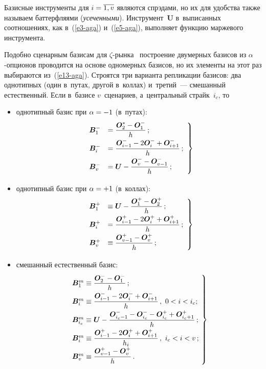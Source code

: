 \begin{multicols}{2}
  Базисные инструменты для $i\hm=\overline{1,v}$ являются спрэдами, но их для 
удобства также называем баттерфляями (\textit{усеченными}). 
Инструмент~$\bm{U}$ в~выписанных соотношениях, как в~(\ref{e3-aga}) 
и~(\ref{e5-aga}),  выполняет функцию маржевого инструмента. 
  
  Подобно сценарным базисам для $\zeta$-рынка~\cite{6-aga} построение 
двумерных базисов из $\alpha$-оп\-ци\-онов проводится на основе одномерных 
базисов, но их элементы на этот раз выбираются из~(\ref{e13-aga}). Строятся 
три варианта репликации базисов: два однотипных (один в~путах, другой 
в~коллах) и~третий~--- смешанный естественный. Если в~базисе $v$~сценариев, 
а~центральный страйк~$i_c$, то 
  \begin{itemize}
\item однотипный базис при $\alpha\hm=-1$ (в~путах):
\begin{equation}
\left.
\begin{array}{rl}
\bm{B}_1^- &=\displaystyle\frac{\displaystyle \bm{O}_2^*-\bm{O}_1^-\mathstrut}{\displaystyle h\mathstrut}\,;\\[6pt]
  \bm{B}_i^- &= \displaystyle\frac{\displaystyle \bm{O}^-_{i-1} -2\bm{O}_i^- +\bm{O}^-_{i+1}\mathstrut}{\displaystyle h\mathstrut}\,;\\[6pt]
   \bm{B}^-_v &=\bm{U}- \displaystyle\frac{\displaystyle \bm{O}_v^- -\bm{O}^-_{v-1}\mathstrut}{\displaystyle h\mathstrut}\,;
   \end{array}
   \right\}
\label{e14-aga}
\end{equation}
\item однотипный базис при $\alpha\hm=+1$ (в~коллах):
\begin{equation}
\left.
\begin{array}{rl}
\bm{B}_1^+ &\equiv \bm{U} - \displaystyle\frac{\displaystyle \bm{O}_1^+ -\bm{O}_2^+\mathstrut}{\displaystyle h\mathstrut}\,;\\[6pt]
  \bm{B}_i^+ &= \displaystyle\frac{\displaystyle \bm{O}^+_{i-1} -2\bm{O}_i^+ +\bm{O}^+_{i+1}\mathstrut}{\displaystyle h\mathstrut}\,;\\[6pt]
    \bm{B}_v^+ &\equiv \displaystyle\frac{\displaystyle \bm{O}^+_{v-1} -\bm{O}_v^+\mathstrut}{\displaystyle h\mathstrut}\,;
    \end{array}
    \right\}
\label{e15-aga}
\end{equation}
\item смешанный естественный базис:
\begin{equation}
\left.
\begin{array}{l}
\!\!\!\bm{B}_1^m\equiv \fr{\bm{O}_2^- -  \bm{O}_1^-}{h}\,;\\[6pt]
  \!\!\!\bm{B}_i^m \equiv \fr{\bm{O}^-_{i-1} -2\bm{O}_i^- +\bm{O}^-_{i+1}}{h}\,,\ 0< i< i_c;\\[6pt]
\!\!\!\bm{B}^m_{i_c} \equiv  \bm{U}-\fr{\bm{O}^-_{i_c-1} -\bm{O}^-_{i_c} -
\bm{O}^+_{i_c} +\bm{O}^+_{i_c+1}}{h}\,;\\[6pt]
\!\!\!\bm{B}_i^m\equiv \fr{\bm{O}^+_{i-1} -2\bm{O}_i^++\bm{O}^+_{i+1}}{h_i}\,,\ i_c<i<v\,;\\[6pt]
 \!\!\!\bm{B}_v^m\equiv \fr{\bm{O}^+_{v-1} -\bm{O}_v^+}{h}\,.
\end{array}\!
\right\}\!
\label{e16-aga}
\end{equation}
  \end{itemize}
  

\end{multicols}
